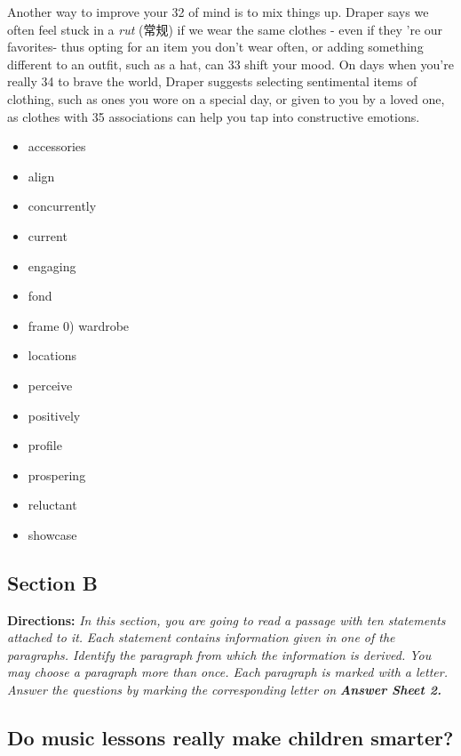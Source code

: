 \documentclass[UTF8,11pt]{ctexart}
\begin{document}
Another way to improve your 32 of mind is to mix things up. Draper says we often feel stuck in a \textit{rut }(常规) if we wear the same clothes - even if they 're our favorites- thus opting for an item you don't wear often, or adding something different to an outfit, such as a hat, can 33 shift your mood. On days when you're really 34 to brave the world, Draper suggests selecting sentimental items of clothing, such as ones you wore on a special day, or given to you by a loved one, as clothes with 35 associations can help you tap into constructive emotions.


\begin{itemize}[leftmargin=2em,itemsep=.2em,topsep=.4em]\item[A.] accessories
\item[B.] align
\item[C.] concurrently
\item[D.] current
\item[E.] engaging
\item[F.] fond
\item[G.] frame 0) wardrobe
\item[H.] locations
\item[I.] perceive
\item[J.] positively
\item[K.] profile
\item[L.] prospering
\item[M.] reluctant
\item[N.] showcase
\end{itemize}

\subsection*{\textbf{Section B}}


\textbf{Directions: }\textit{In this section, you are going to read a passage with ten statements attached to it.} \textit{Each statement contains information given in one of the paragraphs. Identify the paragraph} \textit{from which the information is derived. You may choose a paragraph more than once. Each} \textit{paragraph is marked with a letter. Answer the questions by marking the corresponding letter on} \textbf{\textit{Answer Sheet 2.}}


\subsection*{\textbf{Do music lessons really make children smarter?}}
\end{document}

